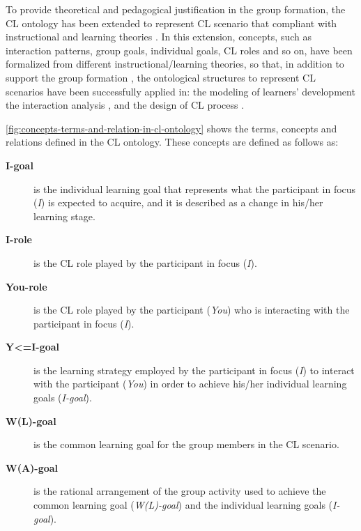 To provide theoretical and pedagogical justification in the group formation, the CL ontology has been extended to represent CL scenario that compliant with instructional and learning theories \cite{InabaMizoguchi2004,IsotaniMizoguchiIsotaniCapeliIsotanideAlbuquerqueBittencourtJaques2013}.
In this extension, concepts, such as interaction patterns, group goals, individual goals, CL roles and so on, have been formalized from different instructional/learning theories, so that, in addition to support the group formation \cite{IsotaniMizoguchi2008}, the ontological structures to represent CL scenarios have been successfully applied in: the modeling of learners' development \cite{InabaIkedaMizoguchi2003} the interaction analysis \cite{InabaOhkuboIkedaMizoguchi2002}, and the design of CL process \cite{IsotaniMizoguchiIsotaniCapeliIsotanideAlbuquerqueBittencourtJaques2013}.

\autoref{fig:concepts-terms-and-relation-in-cl-ontology} shows the terms, concepts and relations defined in the CL ontology. These concepts are defined as follows as:

\begin{description}
 \item[\textbf{I-goal}] is the individual learning goal that represents what the participant in focus (\emph{I}) is expected to acquire, and it is described as a change in his/her learning stage.

 \item[\textbf{I-role}] is the CL role played by the participant in focus (\emph{I}).

 \item[\textbf{You-role}] is the CL role played by the participant (\emph{You}) who is interacting with the participant in focus (\emph{I}).

 \item[\textbf{Y<=I-goal}] is the learning strategy employed by the participant in focus (\emph{I}) to interact with the participant (\emph{You}) in order to achieve his/her individual learning goals (\emph{I-goal}).

 \item[\textbf{W(L)-goal}] is the common learning goal for the group members in the CL scenario.

 \item[\textbf{W(A)-goal}] is the rational arrangement of the group activity used to achieve the common learning goal (\emph{W(L)-goal}) and the individual learning goals (\emph{I-goal}).
\end{description}

